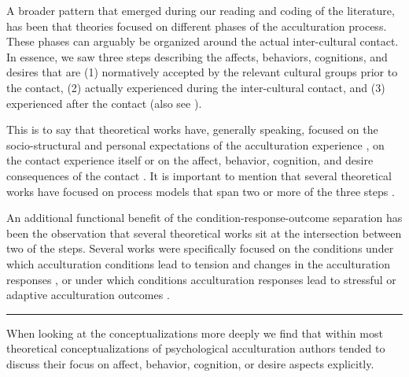 A broader pattern that emerged during our reading and coding of the
literature, has been that theories focused on different phases of the
acculturation process. These phases can arguably be organized around the
actual inter-cultural contact. In essence, we saw three steps describing
the affects, behaviors, cognitions, and desires that are (1) normatively
accepted by the relevant cultural groups prior to the contact, (2)
actually experienced during the inter-cultural contact, and (3)
experienced after the contact (also see ).

This is to say that theoretical works have, generally speaking, focused
on the socio-structural and personal expectations of the acculturation
experience
\citep[i.e., conditions; e.g.,][]{Kim1988, Rogler1994, Navas2005, Giles1977, Tartakovsky2012, Robinson2019, Ward2016, Serdarevic2005},
on the contact experience itself
\citep[i.e., response; e.g.,][]{Berry1992, Berry2005, Sam2003, Riedel2011, Ward2016}
or on the affect, behavior, cognition, and desire consequences of the
contact
\citep[i.e., outcome; e.g.,][]{Baird2015, Berry1998, Berry1992, Berry2005, Riedel2011, Rogler1994, Luedicke2011}.
It is important to mention that several theoretical works have focused
on process models that span two or more of the three steps
\citep[e.g.,][]{Berry1992, Ward2016, Arends-Toth2006a, Rogler1994}.

An additional functional benefit of the condition-response-outcome
separation has been the observation that several theoretical works sit
at the intersection between two of the steps. Several works were
specifically focused on the conditions under which acculturation
conditions lead to tension and changes in the acculturation responses
\citep[i.e., conditions of change; e.g.,][]{Masgoret2006, Alitolppa-Niitamo2004, Grove1985, Wood2014},
or under which conditions acculturation responses lead to stressful or
adaptive acculturation outcomes
\citep[i.e., conditions of stress; e.g.,][; also see  and Figure S1]{Ryan2008, Berry1992, Benet-Martinez2005, Salo2015, Wood2014, Hajro2019}.

\begin{center}\rule{0.5\linewidth}{0.5pt}\end{center}

When looking at the conceptualizations more deeply we find that within
most theoretical conceptualizations of psychological acculturation
authors tended to discuss their focus on affect, behavior, cognition, or
desire aspects explicitly.

